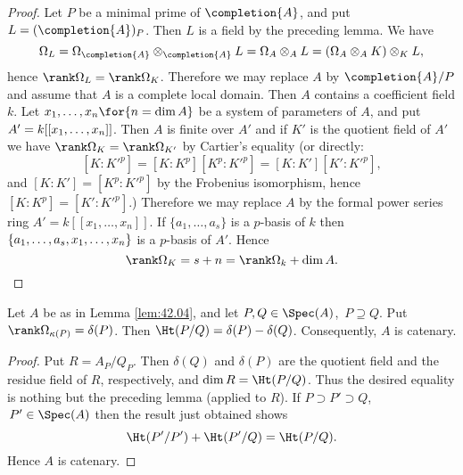 \documentclass[../main]{subfiles}
\begin{document}
\begin{proof}
Let $P$ be a minimal prime of $\completion{A}$, and put $L=(\completion{A})_P$. Then $L$ is a field by the preceding lemma. We have \[\Omega_L=\Omega_{\completion{A}} \otimes_{\completion{A}} L=\Omega_A \otimes_A L=(\Omega_A \otimes_A K) \otimes_K L,\] hence $\rank \Omega_L=\rank \Omega_K$. Therefore we may replace $A$ by $\completion{A} / P$ and assume that $A$ is a complete local domain. Then $A$ contains a coefficient field $k$. Let $x_1, \ldots, x_n\for{n=\dim A}$ be a system of parameters of $A$, and put $A'=k[[x_1, \ldots,\linebreak x_n]]$. Then $A$ is finite over $A'$ and if $K'$ is the quotient field of $A'$ we have \newline $\rank\Omega_K=\rank\Omega_{K'}$ by Cartier's equality (or directly:
\[[K: K'^p]=[K: K^p][K^p: K'^p]=[K: K'][K': K'^p],\] and $[K: K']=[K^p: K'^p]$ by the Frobenius isomorphism, hence \newline $[K: K^p]=[K': K'^p]$.) Therefore we may replace $A$ by the formal power series ring $A'=k[[x_1, \ldots, x_n]]$. If $\{a_1, \ldots, a_s\}$ is a $p$-basis of $k$ then $\{a_1, \ldots, a_s, x_1, \ldots,\linebreak x_n\}$ is a $p$-basis of $A'$. Hence \[\rank \Omega_K=s+n=\rank \Omega_k+\dim A.\]
\end{proof}

\begin{lemma}\label{lem:42.07}
Let $A$ be as in Lemma \ref{lem:42.04}, and let $P, Q \in \Spec(A)$, $\, P \supseteq Q$. Put $\rank\Omega_{\kappa(P)}=\delta(P)$. Then $\Ht(P / Q)=\delta(P)-\delta(Q)$. Consequently, $A$ is catenary.
\end{lemma}

\begin{proof}
Put $R=A_P / Q_P$. Then $\delta(Q)$ and $\delta(P)$ are the quotient field and the residue field of $R$, respectively, and $\dim R=\Ht(P / Q)$. Thus the desired equality is nothing but the preceding lemma (applied to $R$). If $P \supset P' \supset Q$, $\, P' \in \Spec(A)$ then the result just obtained shows \[\Ht(P' / P')+\Ht(P' / Q)=\Ht (P / Q).\] Hence $A$ is catenary.
\end{proof}
\end{document}
